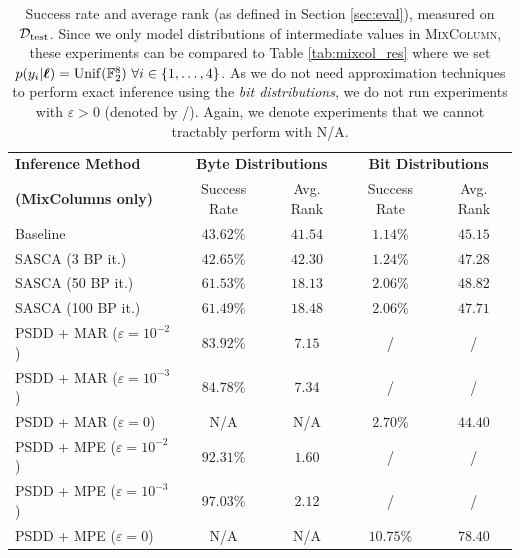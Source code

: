\begin{table}[H]
    \centering
	\begin{tabular}{|l | c | c | c | c |}
		\hline
    \multicolumn{1}{|l|}{\textbf{Inference Method}} & \multicolumn{2}{c|}{\textbf{Byte Distributions}} & \multicolumn{2}{|c|}{\textbf{Bit Distributions}} \\
    \cline{2-5}
    \multicolumn{1}{|l|}{\textbf{(MixColumns only)}} & Success Rate & Avg. Rank & Success Rate & Avg. Rank\\
	\hline %
		Baseline & $43.62 \%$ & $41.54$ & $1.14 \%$ & $45.15$ \\ \hline 
		SASCA (3 BP it.)  & $42.65 \%$ & $42.30$ & $1.24 \%$ & $47.28$ \\ \hline 
		SASCA (50 BP it.)  & $61.53 \%$ & $18.13$ & $2.06 \%$ & $48.82$ \\ \hline 
		SASCA (100 BP it.)  & $61.49 \%$ & $18.48$ & $2.06 \%$ & $47.71$ \\ \hline \hline
		PSDD + MAR ($\varepsilon = 10^{-2}$) & $83.92 \%$ & $7.15$ & / & / \\ \hline 
		PSDD + MAR ($\varepsilon = 10^{-3}$) & $84.78 \%$ & $7.34$ & / & / \\ \hline 
		PSDD + MAR ($\varepsilon = 0$) & N/A & N/A & $2.70 \%$ & $44.40$ \\ \hline \hline
		PSDD + MPE ($\varepsilon = 10^{-2}$) & $92.31 \%$ & $1.60$ & / & / \\ \hline 
		PSDD + MPE ($\varepsilon = 10^{-3}$) & $\mathbf{97.03 \%}$ & $2.12$ & / & / \\ \hline 
		PSDD + MPE ($\varepsilon = 0$) & N/A & N/A & $\mathbf{10.75} \%$ & $78.40$ \\ \hline 
	\end{tabular}
	\caption{Success rate and average rank (as defined in Section \ref{sec:eval}), measured on $\mathcal{D}_{\text{test}}$. Since we only model distributions of intermediate values in \textsc{MixColumn}, these experiments can be compared to Table \ref{tab:mixcol_res} where we set $p(y_i | \boldsymbol{\ell}) = \operatorname{Unif}(\mathbb{F}_2^8) \ \forall i \in \{1,\dots,4\}$. As we do not need approximation techniques to perform exact inference using the \emph{bit distributions}, we do not run experiments with $\varepsilon > 0$ (denoted by /). Again, we denote experiments that we cannot tractably perform with N/A.}
    \label{tab:dlsca_res}
\end{table}

